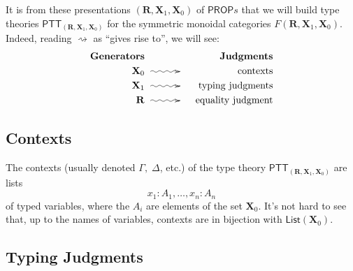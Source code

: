 \documentclass[pra,floatfix,
amsmath,superscriptaddress, 12pt]{article}
\theoremstyle{definition}
\begin{document}
It is from these presentations $(\mathbf{R},\mathbf{X}_1,\mathbf{X}_0)$ of $\mathsf{PROP}s$ that we will build type theories $\mathsf{PTT}_{(\mathbf{R},\mathbf{X}_1,\mathbf{X}_0)}$ for the symmetric monoidal categories $F(\mathbf{R},\mathbf{X}_1,\mathbf{X}_0)$. Indeed, reading $\rightsquigarrow$ as ``gives rise to'', we will see:
    \begin{eqnarray*}
      \mathbf{Generators}
        &
            &
            \mathbf{Judgments}
                \\
      \mathbf{X}_0
        & \xymatrix@C=3em{{}\ar@{~>}[r]&{}}
            & \mathrm{contexts} \\
      \mathbf{X}_1 & \xymatrix@C=3em{{}\ar@{~>}[r]&{}} & \mathrm{typing \ judgments} \\
      \mathbf{R}   & \xymatrix@C=3em{{}\ar@{~>}[r]&{}} & \mathrm{equality \ judgment}
    \end{eqnarray*}

\subsection{Contexts}

The contexts (usually denoted $\Gamma,\;\Delta$, etc.) of the type theory $\mathsf{PTT}_{(\mathbf{R},\mathbf{X}_1,\mathbf{X}_0)}$  are lists
    \[
        x_{1}:A_{1},\dots,x_{n}:A_{n}
    \]
of typed variables, where the $A_i$ are elements of the set $\mathbf{X}_{0}$. It's not hard to see that, up to the names of variables, contexts are in bijection with $\mathsf{List}(\mathbf{X}_0)$.

\subsection{Typing Judgments}
\end{document}
